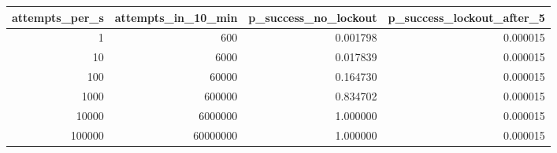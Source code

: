 \begin{tabular}{rrrr}
\toprule
attempts\_per\_s & attempts\_in\_10\_min & p\_success\_no\_lockout & p\_success\_lockout\_after\_5 \\
\midrule
1 & 600 & 0.001798 & 0.000015 \\
10 & 6000 & 0.017839 & 0.000015 \\
100 & 60000 & 0.164730 & 0.000015 \\
1000 & 600000 & 0.834702 & 0.000015 \\
10000 & 6000000 & 1.000000 & 0.000015 \\
100000 & 60000000 & 1.000000 & 0.000015 \\
\bottomrule
\end{tabular}
